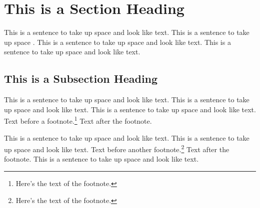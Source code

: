 \section{This is a Section Heading}
 
This is a sentence to take up space and look like text.
This is a sentence to take up space \cite{yetanotherbook}.
This is a sentence to take up space and look like text.
This is a sentence to take up space and look like text.
 
\subsection{This is a Subsection Heading} 
 
This is a sentence to take up space and look like text.
This is a sentence to take up space and look like text.
This is a sentence to take up space and look like text.
Text before a footnote.\footnote{Here's the text 
of the footnote.}
Text after the footnote.
 
This is a sentence to take up space and look like text.
This is a sentence to take up space and look like text.
Text before another footnote.\footnote{Here's the 
text of the footnote.}
Text after the footnote.
This is a sentence to take up space and look like text.


